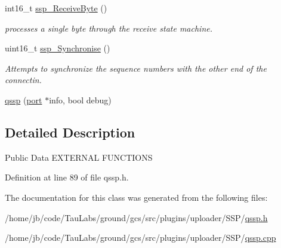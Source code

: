 \begin{DoxyCompactItemize}
int16\-\_\-t \hyperlink{group___uploader_gae06a33d9cc36f1b95bb0bc0a5ab8ca3a}{ssp\-\_\-\-Receive\-Byte} ()
\begin{DoxyCompactList}\small\item\em processes a single byte through the receive state machine. \end{DoxyCompactList}\item 
uint16\-\_\-t \hyperlink{group___uploader_ga6f47e7cf74215ceeaf3d6234ef0c37b7}{ssp\-\_\-\-Synchronise} ()
\begin{DoxyCompactList}\small\item\em \-Attempts to synchronize the sequence numbers with the other end of the connectin. \end{DoxyCompactList}\item 
\hyperlink{group___uploader_ga6b7f70326e497709fc513c3d122379cb}{qssp} (\hyperlink{classport}{port} $\ast$info, bool debug)
\end{DoxyCompactItemize}


\subsection{\-Detailed \-Description}
\-Public \-Data \-E\-X\-T\-E\-R\-N\-A\-L \-F\-U\-N\-C\-T\-I\-O\-N\-S 

\-Definition at line 89 of file qssp.\-h.



\-The documentation for this class was generated from the following files\-:\begin{DoxyCompactItemize}
\item 
/home/jb/code/\-Tau\-Labs/ground/gcs/src/plugins/uploader/\-S\-S\-P/\hyperlink{qssp_8h}{qssp.\-h}\item 
/home/jb/code/\-Tau\-Labs/ground/gcs/src/plugins/uploader/\-S\-S\-P/\hyperlink{qssp_8cpp}{qssp.\-cpp}\end{DoxyCompactItemize}
